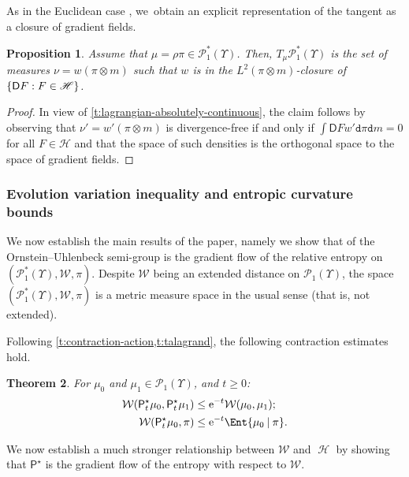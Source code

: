 \documentclass[10pt]{amsart}
\newtheorem{theorem}{Theorem}[section]
\newtheorem{proposition}[theorem]{Proposition}
\theoremstyle{definition}
\theoremstyle{remark}
\DeclarePairedDelimiter{\set}{\lbrace}{\rbrace}
\newcommand{\given}[1][]{%
\nonscript\:#1\vert
\allowbreak
\nonscript\:
\mathopen{}}
\DeclareMathOperator{\ent}{\mathcal{H}}
\begin{document}
As in the Euclidean case \cite[\S 8.1]{AGS}, we~obtain an explicit representation of the tangent as a closure of gradient fields.
\begin{proposition}
Assume that $\mu = \rho \pi \in \mathscr{P}^{*}_{1}(\varUpsilon)$.
Then, $T_{\mu} \mathscr{P}^{*}_{1}(\varUpsilon)$ is the set of measures $\nu = w (\pi \otimes m)$ such that $w$ is in the $L^{2}(\pi \otimes m)$-closure of $\set{ \mathsf{D} F : F \in \mathscr{H} }$.
\end{proposition}

\begin{proof}
In view of \cref{t:lagrangian-absolutely-continuous}, the claim follows by observing that $\nu' = w' (\pi \otimes m)$ is divergence-free if and only if $\int \mathsf{D} F w' \mathtt{d} \pi \mathtt{d} m = 0$ for all $F \in \mathscr{H}$ and that the space of such densities is the orthogonal space to the space of gradient fields.
\end{proof}

\subsubsection{Evolution variation inequality and entropic curvature bounds}

We now establish the main results of the paper, namely we show that of the Ornstein--Uhlenbeck semi-group is the gradient flow of the relative entropy on $(\mathscr{P}_{1}^{*}(\varUpsilon), \mathcal{W}, \pi)$.
Despite $\mathcal{W}$ being an extended distance on $\mathscr{P}_{1}(\varUpsilon)$, the space $(\mathscr{P}_{1}^{*}(\varUpsilon), \mathcal{W}, \pi)$ is a metric measure space in the usual sense (that is, not extended).

Following \cref{t:contraction-action,t:talagrand}, the following contraction estimates hold.

\begin{theorem}\label{t:dou-contractivity}
For $\mu_{0}$ and $\mu_{1} \in \mathscr{P}_{1}(\varUpsilon)$, and $t \geq 0$:
\begin{align}
\mathcal{W}(\mathsf{P}^{\star}_{t} \mu_{0}, \mathsf{P}^{\star}_{t} \mu_{1}) &\leq \mathrm{e}^{-t} \mathcal{W}(\mu_{0}, \mu_{1}); \\
\mathcal{W}(\mathsf{P}^{\star}_{t} \mu_{0}, \pi) &\leq \mathrm{e}^{-t} \Ent{ \mu_{0} \given \pi }.
\end{align}
\end{theorem}
We now establish a much stronger relationship between $\mathcal{W}$ and $\ent$ by showing that $\mathsf{P}^{\star}$ is the gradient flow of the entropy with respect to $\mathcal{W}$.
\end{document}
